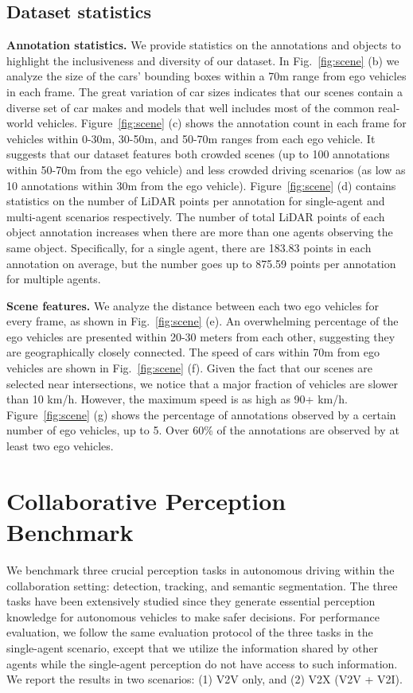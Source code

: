 \subsection{Dataset statistics}
\textbf{Annotation statistics.} 
We provide statistics on the annotations and objects to highlight the inclusiveness and diversity of our dataset. 
In Fig.~\ref{fig:scene} (b) we analyze the size of the cars' bounding boxes within a 70m range from ego vehicles in each frame. The great variation of car sizes indicates that our scenes contain a diverse set of car makes and models that well includes most of the common real-world vehicles. 
Figure~\ref{fig:scene} (c) shows the annotation count in each frame for vehicles within 0-30m, 30-50m, and 50-70m ranges from each ego vehicle. It suggests that our dataset features both crowded scenes (up to 100 annotations within 50-70m from the ego vehicle) and less crowded driving scenarios (as low as 10 annotations within 30m from the ego vehicle). Figure~\ref{fig:scene} (d) contains statistics on the number of LiDAR points per annotation for single-agent and multi-agent scenarios respectively. The number of total LiDAR points of each object annotation increases when there are more than one agents observing the same object. Specifically, for a single agent, there are 183.83 points in each annotation on average, but the number goes up to 875.59 points per annotation for multiple agents. 

\textbf{Scene features.}
We analyze the distance between each two ego vehicles for every frame, as shown in Fig.~\ref{fig:scene} (e). An overwhelming percentage of the ego vehicles are presented within 20-30 meters from each other, suggesting they are geographically closely connected. The speed of cars within 70m from ego vehicles are shown in Fig.~\ref{fig:scene} (f). Given the fact that our scenes are selected near intersections, we notice that a major fraction of vehicles are slower than 10 km/h. However, the maximum speed is as high as 90+ km/h. 
Figure~\ref{fig:scene} (g) shows the percentage of annotations observed by a certain number of ego vehicles, up to 5. Over 60\% of the annotations are observed by at least two ego vehicles.

\section{Collaborative Perception Benchmark}\label{sec:benchmark}

We benchmark three crucial perception tasks in autonomous driving within the collaboration setting: detection, tracking, and semantic segmentation. The three tasks have been extensively studied since they generate essential perception knowledge for autonomous vehicles to make safer decisions. For performance evaluation, we follow the same evaluation protocol of the three tasks in the single-agent scenario, except that we utilize the information shared by other agents while the single-agent perception do not have access to such information. We report the results in two scenarios: (1) V2V only, and (2) V2X (V2V + V2I). 

